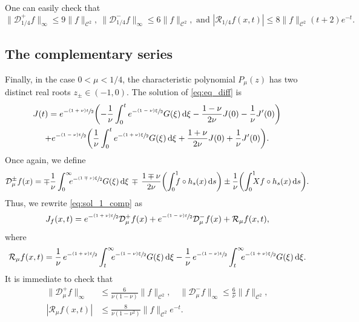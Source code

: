 \documentclass[JEP,XML,SOM,NoEqCountersInSection,Unicode,published]{cedram}
\newcommand{\tpsfrac}[3]{\sfrac{(#1)#3}{#2}}
\newcommand*{\diff}{\mathop{}\!\mathrm{d}}
\newcommand{\Dp}[1]{\mathcal{D}_\mu^{+} #1}
\newcommand{\Dm}[1]{\mathcal{D}_\mu^{-} #1}
\newcommand{\Dpm}[1]{\mathcal{D}_\mu^{\pm} #1}
\theoremstyle{definition}
\begin{document}
One can easily check that
\begin{equation*}
\|\mathcal{D}_{1/4}^{+}f\|_{\infty} \leq 9\|f\|_{\mathscr{C}^2}, \ \|\mathcal{D}_{1/4}^{-}f\|_{\infty} \leq 6 \|f\|_{\mathscr{C}^2}, \text{ and } |\mathcal{R}_{1/4}f(x,t) |\leq 8 \|f\|_{\mathscr{C}^2} (t+2)e^{-t}.
\end{equation*}


\subsection{The complementary series}\label{sec:comp}

Finally, in the case $0< \mu < 1/4$, the characteristic polynomial $P_\mu(z)$ has two distinct real roots $z_{\pm} \in (-1,0)$. The solution of \eqref{eq:eq_diff} is
\begin{multline}\label{eq:sol_1_comp}
J(t) = e^{-\tpsfrac{1+\nu}{2}t} \biggl(- \frac{1}{\nu} \int_0^t e^{-\tpsfrac{1-\nu}{2}\xi} G(\xi) \diff \xi - \frac{1-\nu}{2\nu} J(0) - \frac{1}{\nu}J'(0) \biggr) \\
+ e^{-\tpsfrac{1-\nu}{2}t} \biggl(\frac{1}{\nu} \int_0^t e^{-\tpsfrac{1+\nu}{2}\xi} G(\xi) \diff \xi + \frac{1+\nu}{2\nu} J(0) + \frac{1}{\nu}J'(0) \biggr).
\end{multline}
Once again, we define
\[
\Dpm{f}(x) = \mp \frac{1}{\nu} \int_0^\infty \hspace*{-2mm}e^{-\tpsfrac{1 \mp \nu}{2}\xi} G(\xi) \diff \xi \,\mp\, \frac{1 \mp \nu}{2\nu} \biggl(\int_0^1\hspace*{-2mm} f \circ h_s(x) \diff s \biggr) \pm \frac{1}{\nu} \biggl(\int_0^1\hspace*{-2mm} Xf \circ h_s(x) \diff s \biggr).
\]
Thus, we rewrite \eqref{eq:sol_1_comp} as
\begin{equation}\label{eq:I_mu_comp}
J_f(x,t) = e^{-\tpsfrac{1+\nu}{2}t} \Dp{f}(x) + e^{-\tpsfrac{1-\nu}{2}t} \Dm{f}(x) + \mathcal{R}_\mu f(x,t),
\end{equation}
where
\[
\mathcal{R}_\mu f(x,t) = \frac{1}{\nu}\, e^{-\tpsfrac{1+\nu}{2}t} \int_t^{\infty}\hspace*{-2mm} e^{-\tpsfrac{1-\nu}{2}\xi} G(\xi) \diff \xi - \frac{1}{\nu}\, e^{-\tpsfrac{1-\nu}{2}t} \int_t^{\infty}\hspace*{-2mm} e^{-\tpsfrac{1+\nu}{2}\xi} G(\xi) \diff \xi.
\]
It is immediate to check that
\begin{align*}
\|\Dp{f}\|_{\infty} &\leq \frac{6}{\nu(1-\nu)} \|f\|_{\mathscr{C}^2}, \quad \|\Dm{f}\|_{\infty} \leq \frac{6}{\nu} \|f\|_{\mathscr{C}^2},\\
\tag*{and} |\mathcal{R}_\mu f(x,t) |&\leq \frac{8}{\nu(1-\nu^2)} \|f\|_{\mathscr{C}^2} e^{-t}.
\end{align*}
\end{document}
